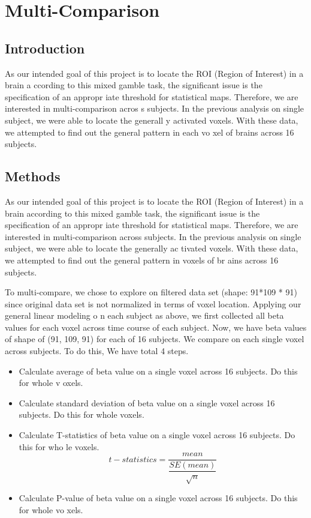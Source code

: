 \section{Multi-Comparison}

\subsection{Introduction}
As our intended goal of this project is to locate the ROI (Region of Interest) in a brain a
ccording to this mixed gamble task, the significant issue is the specification of an appropr
iate threshold for statistical maps. Therefore, we are interested in multi-comparison acros
s subjects. In the previous analysis on single subject, we were able to locate the generall
y activated voxels. With these data, we attempted to find out the general pattern in each vo
xel of brains across 16 subjects. 

\subsection{Methods}
As our intended goal of this project is to locate the ROI (Region of Interest) in a brain 
according to this mixed gamble task, the significant issue is the specification of an appropr
iate threshold for statistical maps. Therefore, we are interested in multi-comparison across 
subjects. In the previous analysis on single subject, we were able to locate the generally ac
tivated voxels. With these data, we attempted to find out the general pattern in voxels of br
ains across 16 subjects. 

To multi-compare, we chose to explore on filtered data set (shape: 91*109 * 91) since original
 data set is not normalized in terms of voxel location. Applying our general linear modeling o
 n each subject as above, we first collected all beta values for each voxel across time course
  of each subject. Now, we have beta values of shape of (91, 109, 91) for each of 16 subjects.
   We compare on each single voxel across subjects. To do this, We have total 4 steps.

\begin{itemize}
\item Calculate average of beta value on a single voxel across 16 subjects. Do this for whole v
oxels.
\item Calculate standard deviation of beta value on a single voxel across 16 subjects. Do this 
for whole voxels. 
\item Calculate T-statistics of beta value on a single voxel across 16 subjects. Do this for who
le voxels.
\[ 
  t-statistics = \dfrac{mean}{\dfrac{SE(mean)}{\sqrt{n}}}
\]

\item Calculate P-value of beta value on a single voxel across 16 subjects. Do this for whole vo
xels. 
\end{itemize}


